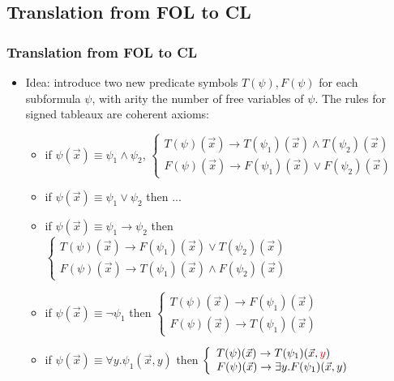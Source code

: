 \documentclass[handout,11pt]{beamer}
\newcommand{\red}[1]{\textcolor{red}{#1}}
\begin{document}
\subsection{Translation from FOL to CL}

\begin{frame}
\frametitle{Translation from FOL to CL}
 \begin{itemize}[<+->]
   \item Idea: introduce two new predicate symbols 
   $T(\psi),F(\psi)$ for each subformula $\psi$, 
   with arity the number of free variables of $\psi$.
   The rules for signed tableaux are coherent axioms:
   \begin{itemize} 
   \item 
 if $\psi(\vec{x})\equiv\psi_1\wedge\psi_2$,
$\left\{\begin{array}{ll}
T(\psi)(\vec{x})\to T(\psi_1)(\vec{x})\wedge T(\psi_2)(\vec{x})\\
F(\psi)(\vec{x})\to F(\psi_1)(\vec{x})\vee F(\psi_2)(\vec{x})
\end{array}\right.$

\item

 if $\psi(\vec{x})\equiv\psi_1\vee \psi_2$ then ...

\item
  if $\psi(\vec{x})\equiv\psi_1\to \psi_2$ then 
$\left\{\begin{array}{ll}
T(\psi)(\vec{x})\to F(\psi_1)(\vec{x})\vee T(\psi_2)(\vec{x})\\
F(\psi)(\vec{x})\to T(\psi_1)(\vec{x})\wedge F(\psi_2)(\vec{x})
\end{array}\right.$

\item

 if $\psi(\vec{x})\equiv\neg \psi_1$ then 
$\left\{\begin{array}{ll}
T(\psi)(\vec{x})\to F(\psi _1)(\vec{x})\\
F(\psi)(\vec{x})\to T(\psi _1)(\vec{x})
\end{array}\right.$

\item

 if $\psi(\vec{x})\equiv\forall y.\psi_1(\vec{x},y)$ then 
$\left\{\begin{array}{ll}
T(\psi)(\vec{x})\to T(\psi_1)(\vec{x},\red{y})\\
F(\psi)(\vec{x})\to \exists y.F(\psi_1)(\vec{x},y)
\end{array}\right.$


\end{itemize}
\end{itemize}
\end{frame}
\end{document}
